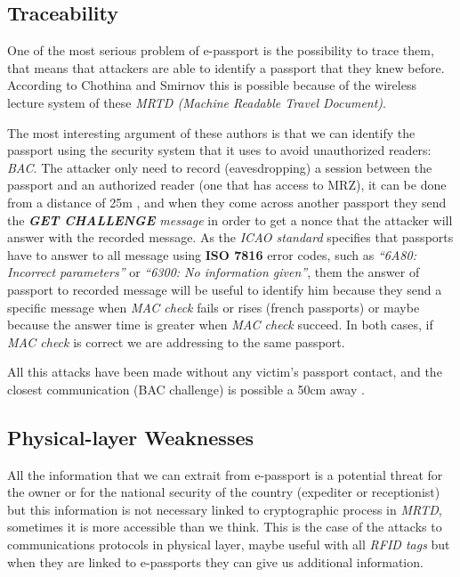 \documentclass{acm_proc_article-sp}
\begin{document}
\subsection{Traceability}
\label{subsec:trace}

One of the most serious problem of e-passport is the possibility to trace them, that means that  
attackers are able to identify a passport that they knew before. According to Chothina and Smirnov 
\cite{CHTOM2010} this is possible because of the wireless lecture system of these 
\textit{MRTD (Machine Readable Travel Document)}.

The most interesting argument of these authors \cite{CHTOM2010} is that we can identify the passport using the 
security system that it uses to avoid unauthorized readers: \textit{BAC}. The attacker only need to record 
(eavesdropping) a session between the passport and an authorized reader (one that has access to MRZ), 
it can be done from a distance of 25m \cite{02COPA}, and when they come across another passport they send 
the \textit{\textbf{GET CHALLENGE} message} in order to get a nonce that the attacker will answer with the recorded message. 
As the \textit{ICAO standard} specifies that passports have to answer to all message using \textbf{ISO 7816} error codes, 
such as \textit{``6A80: Incorrect parameters''} or \textit{``6300: No information given''}, them the answer of passport to 
recorded message will be useful to identify him because they send a specific message when \textit{MAC check} 
fails or rises  (french passports) or maybe because the answer time is greater when \textit{MAC check} succeed. 
In both cases, if \textit{MAC check} is correct we are addressing to the same passport.

All this attacks have been made without any victim’s passport contact, and the closest communication 
(BAC challenge) is possible a 50cm away \cite{CHTOM2010}.

\subsection{Physical-layer Weaknesses}
All the information that we can extrait from e-passport is a potential threat for the owner or for 
the national security of the country (expediter or receptionist) but this information is not necessary 
linked to cryptographic process in \textit{MRTD}, sometimes it is more accessible than we think. This is the 
case of the attacks to communications protocols in physical layer, maybe useful with all \textit{RFID tags} 
but when they are linked to e-passports they can give us additional information.
\end{document}
